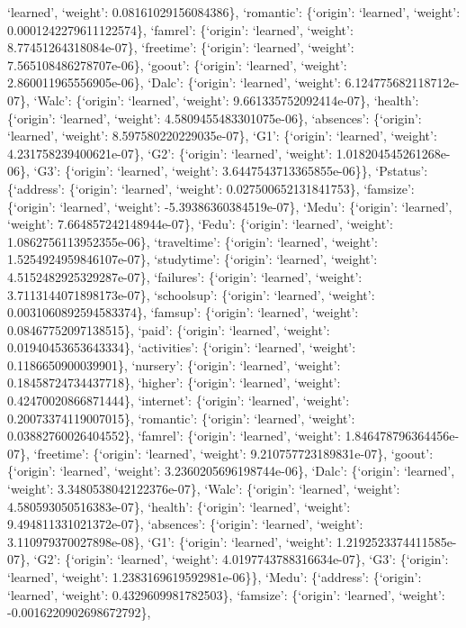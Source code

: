 \documentclass[
]{article}
\begin{document}
`learned', `weight': 0.08161029156084386\}, `romantic': \{`origin':
`learned', `weight': 0.0001242279611122574\}, `famrel': \{`origin':
`learned', `weight': 8.77451264318084e-07\}, `freetime': \{`origin':
`learned', `weight': 7.565108486278707e-06\}, `goout': \{`origin':
`learned', `weight': 2.860011965556905e-06\}, `Dalc': \{`origin':
`learned', `weight': 6.124775682118712e-07\}, `Walc': \{`origin':
`learned', `weight': 9.661335752092414e-07\}, `health': \{`origin':
`learned', `weight': 4.5809455483301075e-06\}, `absences': \{`origin':
`learned', `weight': 8.597580220229035e-07\}, `G1': \{`origin':
`learned', `weight': 4.231758239400621e-07\}, `G2': \{`origin':
`learned', `weight': 1.018204545261268e-06\}, `G3': \{`origin':
`learned', `weight': 3.6447543713365855e-06\}\}, `Pstatus': \{`address':
\{`origin': `learned', `weight': 0.027500652131841753\}, `famsize':
\{`origin': `learned', `weight': -5.39386360384519e-07\}, `Medu':
\{`origin': `learned', `weight': 7.664857242148944e-07\}, `Fedu':
\{`origin': `learned', `weight': 1.0862756113952355e-06\}, `traveltime':
\{`origin': `learned', `weight': 1.5254924959846107e-07\}, `studytime':
\{`origin': `learned', `weight': 4.5152482925329287e-07\}, `failures':
\{`origin': `learned', `weight': 3.7113144071898173e-07\}, `schoolsup':
\{`origin': `learned', `weight': 0.0031060892594583374\}, `famsup':
\{`origin': `learned', `weight': 0.08467752097138515\}, `paid':
\{`origin': `learned', `weight': 0.01940453653643334\}, `activities':
\{`origin': `learned', `weight': 0.1186650900039901\}, `nursery':
\{`origin': `learned', `weight': 0.18458724734437718\}, `higher':
\{`origin': `learned', `weight': 0.42470020866871444\}, `internet':
\{`origin': `learned', `weight': 0.20073374119007015\}, `romantic':
\{`origin': `learned', `weight': 0.03882760026404552\}, `famrel':
\{`origin': `learned', `weight': 1.846478796364456e-07\}, `freetime':
\{`origin': `learned', `weight': 9.210757723189831e-07\}, `goout':
\{`origin': `learned', `weight': 3.2360205696198744e-06\}, `Dalc':
\{`origin': `learned', `weight': 3.3480538042122376e-07\}, `Walc':
\{`origin': `learned', `weight': 4.580593050516383e-07\}, `health':
\{`origin': `learned', `weight': 9.494811331021372e-07\}, `absences':
\{`origin': `learned', `weight': 3.110979370027898e-08\}, `G1':
\{`origin': `learned', `weight': 1.2192523374411585e-07\}, `G2':
\{`origin': `learned', `weight': 4.0197743788316634e-07\}, `G3':
\{`origin': `learned', `weight': 1.2383169619592981e-06\}\}, `Medu':
\{`address': \{`origin': `learned', `weight': 0.4329609981782503\},
`famsize': \{`origin': `learned', `weight': -0.0016220902698672792\},
\end{document}
